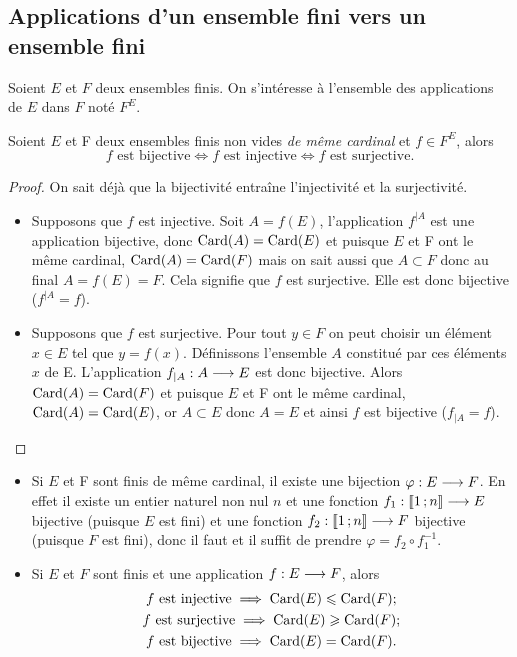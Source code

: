 \subsection{Applications d'un ensemble fini vers un ensemble fini}

Soient \(E\) et \(F\) deux ensembles finis. On s'intéresse à l'ensemble des 
applications de \(E\) dans \(F\) noté \(F^E\).

\begin{theo}
  \label{theo:bijinjsurj}
  Soient \(E\) et F deux ensembles finis non vides \emph{de même cardinal} et 
  \(f\in F^E\), alors
  \begin{equation}
    f \text{~est bijective}\iff f \text{~est injective}\iff f \text{~est 
    surjective}.
  \end{equation}
\end{theo}

\begin{proof}
  On sait déjà que la bijectivité entraîne l'injectivité et la surjectivité.
  \begin{itemize}
    \item Supposons que \(f\) est injective. Soit \(A = f(E)\), l'application 
      \(f^{|A}\) est une application bijective, donc \(\operatorname{Card}(A) = \operatorname{Card}(E)\) et 
      puisque \(E\) et F ont le même cardinal, \(\operatorname{Card}(A) = \operatorname{Card}(F)\) mais on 
      sait aussi que \(A\subset F\) donc au final \(A = f(E) = F\). Cela 
      signifie que \(f\) est surjective. Elle est donc bijective (\(f^{|A} = 
      f\)).
    \item Supposons que \(f\) est surjective. Pour tout \(y\in F\) on peut 
      choisir un élément \(x\in E\) tel que \(y = f(x)\). Définissons l'ensemble 
      \(A\) constitué par ces éléments \(x\) de E. L'application 
      \(f_{|A}:A \longrightarrow E\) est donc bijective. Alors \(\operatorname{Card}(A) = 
      \operatorname{Card}(F)\) et puisque \(E\) et F ont le même cardinal, \(\operatorname{Card}(A) = 
      \operatorname{Card}(E)\), or \(A\subset E\) donc \(A = E\) et ainsi \(f\) est bijective 
      (\(f_{|A} = f\)).
  \end{itemize}
\end{proof}

\begin{itemize}
  \item Si \(E\) et F sont finis de même cardinal, il existe une bijection 
    \(\varphi:E \longrightarrow F\). En effet il existe un entier naturel non nul 
    \(n\) et une fonction \(f_1:\mathopen{\llbracket}1\mathclose{}\mathpunct{};n\mathclose{\rrbracket} \longrightarrow E\) 
    bijective (puisque \(E\) est fini) et une fonction 
    \(f_2:\mathopen{\llbracket}1\mathclose{}\mathpunct{};n\mathclose{\rrbracket} \longrightarrow F\) bijective (puisque \(F\) est 
    fini), donc il faut et il suffit de prendre \(\varphi = f_2\circ f_1^{-1}\).
  \item Si \(E\) et \(F\) sont finis et une application \(f:E \longrightarrow F\), 
    alors
    \begin{gather}
      f \text{~est injective} \implies \operatorname{Card}(E)\leqslant\operatorname{Card}(F); \\
      f \text{~est surjective}\implies \operatorname{Card}(E)\geqslant\operatorname{Card}(F);\\
      f \text{~est bijective} \implies \operatorname{Card}(E) = \operatorname{Card}(F).
    \end{gather}
\end{itemize}

